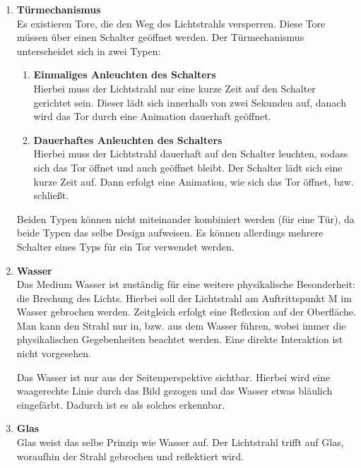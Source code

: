 \begin{enumerate}
\item \textbf{Türmechanismus} \hfill \\
Es existieren Tore, die den Weg des Lichtstrahls versperren. Diese Tore müssen über einen Schalter geöffnet werden. Der Türmechanismus unterscheidet sich in zwei Typen:
\begin{enumerate}
\item \textbf{Einmaliges Anleuchten des Schalters}\hfill \\
Hierbei muss der Lichtstrahl nur eine kurze Zeit auf den Schalter gerichtet sein. Dieser lädt sich innerhalb von zwei Sekunden auf, danach wird das Tor durch eine Animation dauerhaft geöffnet.
\item \textbf{Dauerhaftes Anleuchten des Schalters}\hfill \\
Hierbei muss der Lichtstrahl dauerhaft auf den Schalter leuchten, sodass sich das Tor öffnet und auch geöffnet bleibt. Der Schalter lädt sich eine kurze Zeit auf. Dann erfolgt eine Animation, wie sich das Tor öffnet, bzw. schließt.
\end{enumerate}
Beiden Typen können nicht miteinander kombiniert werden (für eine Tür), da beide Typen das selbe Design aufweisen. Es können allerdings mehrere Schalter eines Typs für ein Tor verwendet werden.




\item \textbf{Wasser} \hfill \\
Das Medium Wasser ist zuständig für eine weitere physikalische Besonderheit: die Brechung des Lichts. Hierbei soll der Lichtstrahl am Auftrittspunkt M im Wasser gebrochen werden. Zeitgleich erfolgt eine Reflexion auf der Oberfläche. Man kann den Strahl nur in, bzw. aus dem Wasser führen, wobei immer die physikalischen Gegebenheiten beachtet werden. Eine direkte Interaktion ist nicht vorgesehen.

Das Wasser ist nur aus der Seitenperspektive sichtbar. Hierbei wird eine waagerechte Linie durch das Bild gezogen und das Wasser etwas bläulich eingefärbt. Dadurch ist es als solches erkennbar.

\item \textbf{Glas} \hfill \\
Glas weist das selbe Prinzip wie Wasser auf. Der Lichtstrahl trifft auf Glas, woraufhin der Strahl gebrochen und reflektiert wird.


\end{enumerate}
